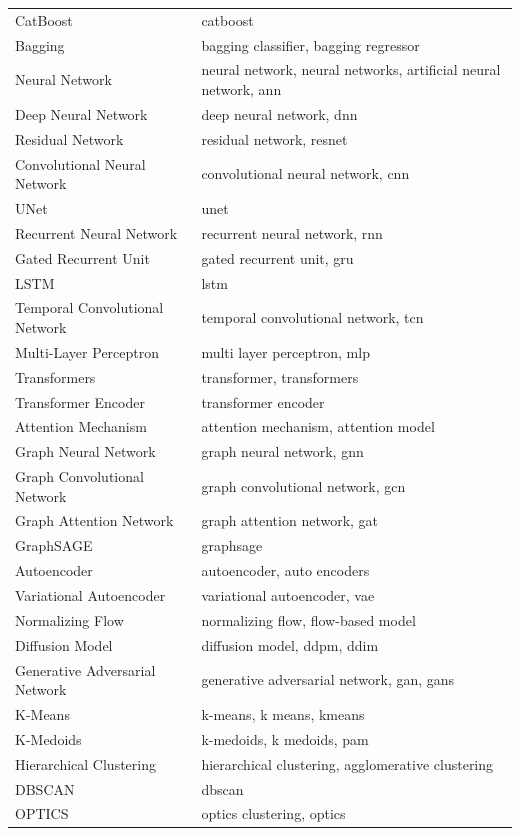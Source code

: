 \begin{xltabular}{\textwidth}{lX}
CatBoost & catboost \\
Bagging & bagging classifier, bagging regressor \\
\addlinespace
Neural Network & neural network, neural networks, artificial neural network, ann \\
Deep Neural Network & deep neural network, dnn \\
Residual Network & residual network, resnet \\
Convolutional Neural Network & convolutional neural network, cnn \\
UNet & unet \\
Recurrent Neural Network & recurrent neural network, rnn \\
Gated Recurrent Unit & gated recurrent unit, gru \\
LSTM & lstm \\
Temporal Convolutional Network & temporal convolutional network, tcn \\
Multi-Layer Perceptron & multi layer perceptron, mlp \\
Transformers & transformer, transformers \\
Transformer Encoder & transformer encoder \\
Attention Mechanism & attention mechanism, attention model \\
Graph Neural Network & graph neural network, gnn \\
Graph Convolutional Network & graph convolutional network, gcn \\
Graph Attention Network & graph attention network, gat \\
GraphSAGE & graphsage \\
\addlinespace
Autoencoder & autoencoder, auto encoders \\
Variational Autoencoder & variational autoencoder, vae \\
Normalizing Flow & normalizing flow, flow-based model \\
Diffusion Model & diffusion model, ddpm, ddim \\
Generative Adversarial Network & generative adversarial network, gan, gans \\
\addlinespace
K-Means & k-means, k means, kmeans \\
K-Medoids & k-medoids, k medoids, pam \\
Hierarchical Clustering & hierarchical clustering, agglomerative clustering \\
DBSCAN & dbscan \\
OPTICS & optics clustering, optics \\

\end{xltabular}
